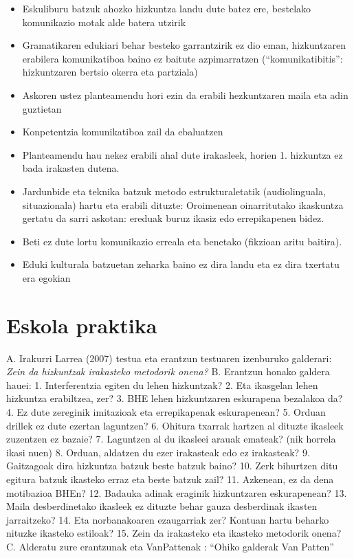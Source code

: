 \documentclass[
]{book}
\begin{document}
\begin{itemize}
\item
  Eskuliburu batzuk ahozko hizkuntza landu dute batez ere, bestelako komunikazio motak alde batera utzirik
\item
  Gramatikaren edukiari behar besteko garrantzirik ez dio eman, hizkuntzaren erabilera komunikatiboa baino ez baitute azpimarratzen (``komunikatibitis'': hizkuntzaren bertsio okerra eta partziala)
\item
  Askoren ustez planteamendu hori ezin da erabili hezkuntzaren maila eta adin guztietan
\item
  Konpetentzia komunikatiboa zail da ebaluatzen
\item
  Planteamendu hau nekez erabili ahal dute irakasleek, horien 1. hizkuntza ez bada irakasten dutena.
\item
  Jardunbide eta teknika batzuk metodo estrukturaletatik (audiolinguala, situazionala) hartu eta erabili dituzte: Oroimenean oinarritutako ikaskuntza gertatu da sarri askotan: ereduak buruz ikasiz edo errepikapenen bidez.
\item
  Beti ez dute lortu komunikazio erreala eta benetako (fikzioan aritu baitira).
\item
  Eduki kulturala batzuetan zeharka baino ez dira landu eta ez dira txertatu era egokian
\end{itemize}

\hypertarget{eskola-praktika}{%
\chapter{Eskola praktika}\label{eskola-praktika}}

A. Irakurri Larrea (2007) testua eta erantzun testuaren izenburuko galderari:
\emph{Zein da hizkuntzak irakasteko metodorik onena?}
B. Erantzun honako galdera hauei:
1. Interferentzia egiten du lehen hizkuntzak?
2. Eta ikasgelan lehen hizkuntza erabiltzea, zer?
3. BHE lehen hizkuntzaren eskurapena bezalakoa da?
4. Ez dute zereginik imitazioak eta errepikapenak eskurapenean?
5. Orduan drillek ez dute ezertan laguntzen?
6. Ohitura txarrak hartzen al dituzte ikasleek zuzentzen ez bazaie?
7. Laguntzen al du ikasleei arauak emateak? (nik horrela ikasi nuen)
8. Orduan, aldatzen du ezer irakasteak edo ez irakasteak?
9. Gaitzagoak dira hizkuntza batzuk beste batzuk baino?
10. Zerk bihurtzen ditu egitura batzuk ikasteko erraz eta beste batzuk zail?
11. Azkenean, ez da dena motibazioa BHEn?
12. Badauka adinak eraginik hizkuntzaren eskurapenean?
13. Maila desberdinetako ikasleek ez dituzte behar gauza desberdinak ikasten jarraitzeko?
14. Eta norbanakoaren ezaugarriak zer? Kontuan hartu beharko nituzke ikasteko estiloak?
15. Zein da irakasteko eta ikasteko metodorik onena?
C. Alderatu zure erantzunak eta VanPattenak : ``Ohiko galderak Van Patten''
\end{document}
